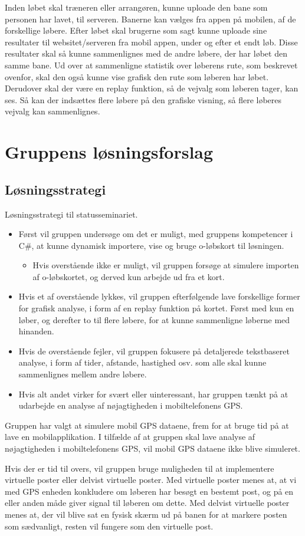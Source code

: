 Inden løbet skal træneren eller arrangøren, kunne uploade den bane som personen har lavet, til serveren. Banerne kan vælges fra appen på mobilen, af de forskellige løbere. Efter løbet skal brugerne som sagt kunne uploade sine resultater til websitet/serveren fra mobil appen, under og efter et endt løb. Disse resultater skal så kunne sammenlignes med de andre løbere, der har løbet den samme bane. Ud over at sammenligne statistik over løberens rute, som beskrevet ovenfor, skal den også kunne vise grafisk den rute som løberen har løbet. Derudover skal der være en replay funktion, så de vejvalg som løberen tager, kan ses. Så kan der indsættes flere løbere på den grafiske visning, så flere løberes vejvalg kan sammenlignes.

\section{Gruppens løsningsforslag}
\subsection {Løsningsstrategi}
Løsningsstrategi til statusseminariet.
\begin{itemize}
\item Først vil gruppen undersøge om det er muligt, med gruppens kompetencer i C\#, at kunne dynamisk importere, vise og bruge o-løbskort til løsningen.
\begin{itemize}
\item Hvis overstående ikke er muligt, vil gruppen forsøge at simulere importen af o-løbskortet, og derved kun arbejde ud fra et kort.
\end{itemize}
\item Hvis et af overstående lykkes, vil gruppen efterfølgende lave forskellige former for grafisk analyse, i form af en replay funktion på kortet. Først med kun en løber, og derefter to til flere løbere, for at kunne sammenligne løberne med hinanden.
\item Hvis de overstående fejler, vil gruppen fokusere på detaljerede tekstbaseret analyse, i form af tider, afstande, hastighed osv. som alle skal kunne sammenlignes mellem andre løbere.
\item Hvis alt andet virker for svært eller uinteressant, har gruppen tænkt på at udarbejde en analyse af nøjagtigheden i mobiltelefonens GPS.
\end{itemize}
Gruppen har valgt at simulere mobil GPS dataene, frem for at bruge tid på at lave en mobilapplikation. I tilfælde af at gruppen skal lave analyse af nøjagtigheden i mobiltelefonens GPS, vil mobil GPS dataene ikke blive simuleret. 
 
Hvis der er tid til overs, vil gruppen bruge muligheden til at implementere virtuelle poster eller delvist virtuelle poster. Med virtuelle poster menes at, at vi med GPS enheden konkludere om løberen har besøgt en bestemt post, og på en eller anden måde giver signal til løberen om dette. Med delvist virtuelle poster menes at, der vil blive sat en fysisk skærm ud på banen for at markere posten som sædvanligt, resten vil fungere som den virtuelle post.


